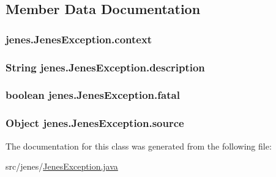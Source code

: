 \subsection{Member Data Documentation}
\hypertarget{classjenes_1_1_jenes_exception_a0ed4376ac804c15c7b6b69f4ba5db061}{
\subsubsection[{context}]{ jenes.\-Jenes\-Exception.\-context\hspace{0.3cm}{\ttfamily [private]}}}\label{classjenes_1_1_jenes_exception_a0ed4376ac804c15c7b6b69f4ba5db061}
\hypertarget{classjenes_1_1_jenes_exception_aff1de32172bcad9e5c5d547f6ba14176}{
\subsubsection[{description}]{\setlength{\rightskip}{0pt plus 5cm}String jenes.\-Jenes\-Exception.\-description\hspace{0.3cm}{\ttfamily [private]}}}\label{classjenes_1_1_jenes_exception_aff1de32172bcad9e5c5d547f6ba14176}
\hypertarget{classjenes_1_1_jenes_exception_aed895f6a8b793ec64394b3ed9f8a01e3}{
\subsubsection[{fatal}]{\setlength{\rightskip}{0pt plus 5cm}boolean jenes.\-Jenes\-Exception.\-fatal\hspace{0.3cm}{\ttfamily [private]}}}\label{classjenes_1_1_jenes_exception_aed895f6a8b793ec64394b3ed9f8a01e3}
\hypertarget{classjenes_1_1_jenes_exception_aa082145f9f5ec052a640e6b2c43fdf71}{
\subsubsection[{source}]{\setlength{\rightskip}{0pt plus 5cm}Object jenes.\-Jenes\-Exception.\-source\hspace{0.3cm}{\ttfamily [private]}}}\label{classjenes_1_1_jenes_exception_aa082145f9f5ec052a640e6b2c43fdf71}


The documentation for this class was generated from the following file\-:\begin{DoxyCompactItemize}
\item 
src/jenes/\hyperlink{_jenes_exception_8java}{Jenes\-Exception.\-java}\end{DoxyCompactItemize}

